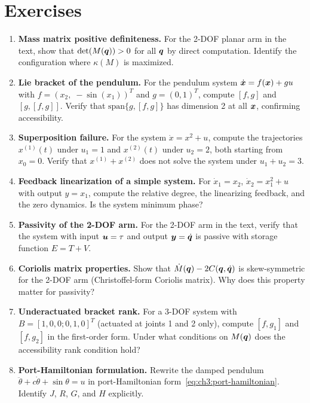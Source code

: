 \section*{Exercises}

\begin{enumerate}
\item \textbf{Mass matrix positive definiteness.}
      For the 2-DOF planar arm in the text, show that $\det(M(\bm{q})) > 0$ for all $\bm{q}$
      by direct computation. Identify the configuration where $\kappa(M)$ is maximized.

\item \textbf{Lie bracket of the pendulum.}
      For the pendulum system $\dot{\bm{x}} = f(\bm{x}) + g u$ with $f = (x_2,\; -\sin(x_1))^T$
      and $g = (0, 1)^T$, compute $[f, g]$ and $[g, [f, g]]$. Verify that
      $\text{span}\{g, [f, g]\}$ has dimension 2 at all $\bm{x}$, confirming accessibility.

\item \textbf{Superposition failure.}
      For the system $\dot{x} = x^2 + u$, compute the trajectories $x^{(1)}(t)$ under
      $u_1 = 1$ and $x^{(2)}(t)$ under $u_2 = 2$, both starting from $x_0 = 0$.
      Verify that $x^{(1)} + x^{(2)}$ does not solve the system under $u_1 + u_2 = 3$.

\item \textbf{Feedback linearization of a simple system.}
      For $\dot{x}_1 = x_2$, $\dot{x}_2 = x_1^2 + u$ with output $y = x_1$, compute the
      relative degree, the linearizing feedback, and the zero dynamics. Is the system minimum phase?

\item \textbf{Passivity of the 2-DOF arm.}
      For the 2-DOF arm in the text, verify that the system with input $\bm{u} = \tau$ and
      output $\bm{y} = \dot{\bm{q}}$ is passive with storage function $E = T + V$.

\item \textbf{Coriolis matrix properties.}
      Show that $\dot{M}(\bm{q}) - 2C(\bm{q}, \dot{\bm{q}})$ is skew-symmetric for the 2-DOF arm
      (Christoffel-form Coriolis matrix). Why does this property matter for passivity?

\item \textbf{Underactuated bracket rank.}
      For a 3-DOF system with $B = [1, 0, 0; 0, 1, 0]^T$ (actuated at joints 1 and 2
      only), compute $[f, g_1]$ and $[f, g_2]$ in the first-order form. Under what
      conditions on $M(\bm{q})$ does the accessibility rank condition hold?

\item \textbf{Port-Hamiltonian formulation.}
      Rewrite the damped pendulum $\ddot\theta + c\dot\theta + \sin\theta = u$ in
      port-Hamiltonian form~\eqref{eq:ch3:port-hamiltonian}. Identify $J$, $R$, $G$,
      and $H$ explicitly.
\end{enumerate}
